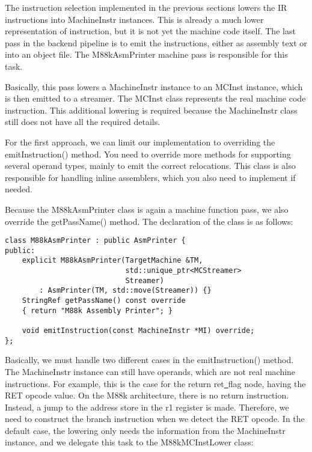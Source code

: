 The instruction selection implemented in the previous sections lowers the IR instructions into MachineInstr instances. This is already a much lower representation of instruction, but it is not yet the machine code itself. The last pass in the backend pipeline is to emit the instructions, either as assembly text or into an object file. The M88kAsmPrinter machine pass is responsible for this task.\par

Basically, this pass lowers a MachineInstr instance to an MCInst instance, which is then emitted to a streamer. The MCInst class represents the real machine code instruction. This additional lowering is required because the MachineInstr class still does not have all the required details.\par

For the first approach, we can limit our implementation to overriding the emitInstruction() method. You need to override more methods for supporting several operand types, mainly to emit the correct relocations. This class is also responsible for handling inline assemblers, which you also need to implement if needed.\par

Because the M88kAsmPrinter class is again a machine function pass, we also override the getPassName() method. The declaration of the class is as follows:\par

\begin{lstlisting}[caption={}]
class M88kAsmPrinter : public AsmPrinter {
public:
	explicit M88kAsmPrinter(TargetMachine &TM,
							std::unique_ptr<MCStreamer>
							Streamer)
		: AsmPrinter(TM, std::move(Streamer)) {}
	StringRef getPassName() const override
	{ return "M88k Assembly Printer"; }
	
	void emitInstruction(const MachineInstr *MI) override;
};
\end{lstlisting}

Basically, we must handle two different cases in the emitInstruction() method. The MachineInstr instance can still have operands, which are not real machine instructions. For example, this is the case for the return ret\underline{~}flag node, having the RET opcode value. On the M88k architecture, there is no return instruction. Instead, a jump to the address store in the r1 register is made. Therefore, we need to construct the branch instruction when we detect the RET opcode. In the default case, the lowering only needs the information from the MachineInstr instance, and we delegate this task to the M88kMCInstLower class:\par

